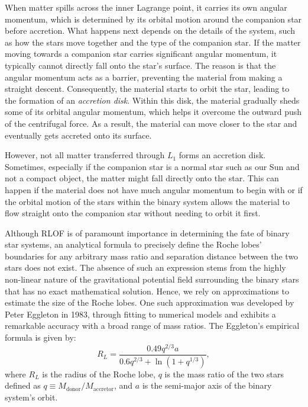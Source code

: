\documentclass[main.tex]{subfiles}
\begin{document}
    When matter spills across the inner Lagrange point, it carries its own angular momentum, which is determined by its orbital motion around the companion star before accretion. What happens next depends on the details of the system, such as how the stars move together and the type of the companion star. 
    If the matter moving towards a companion star carries significant angular momentum, it typically cannot directly fall onto the star's surface. The reason is that the angular momentum acts as a barrier, preventing the material from making a straight descent. Consequently, the material starts to orbit the star, leading to the formation of an \textit{accretion disk}. Within this disk, the material gradually sheds some of its orbital angular momentum, which helps it overcome the outward push of the centrifugal force. As a result, the material can move closer to the star and eventually gets accreted onto its surface.
    
    However, not all matter transferred through $L_1$ forms an accretion disk. Sometimes, especially if the companion star is a normal star such as our Sun and not a compact object, the matter might fall directly onto the star. This can happen if the material does not have much angular momentum to begin with or if the orbital motion of the stars within the binary system allows the material to flow straight onto the companion star without needing to orbit it first.

    Although RLOF is of paramount importance in determining the fate of binary star systems, an analytical formula to precisely define the Roche lobes' boundaries for any arbitrary mass ratio and separation distance between the two stars does not exist. The absence of such an expression stems from the highly non-linear nature of the gravitational potential field surrounding the binary stars that has no exact mathematical solution. Hence, we rely on approximations to estimate the size of the Roche lobes. One such approximation was developed by Peter Eggleton in 1983, through fitting to numerical models and exhibits a remarkable accuracy with a broad range of mass ratios. The Eggleton's empirical formula is given by:
    \begin{equation}\label{eq:eggleton_formula}
       R_L = \frac{0.49 q^{2/3} a}{0.6 q^{2/3} + \ln(1 + q^{1/3})},
    \end{equation}
    where $R_L$ is the radius of the Roche lobe, $q$ is the mass ratio of the two stars defined as $q\equiv M_\mathrm{donor}/M_\mathrm{accretor}$, and $a$ is the semi-major axis of the binary system's orbit.
\end{document}
